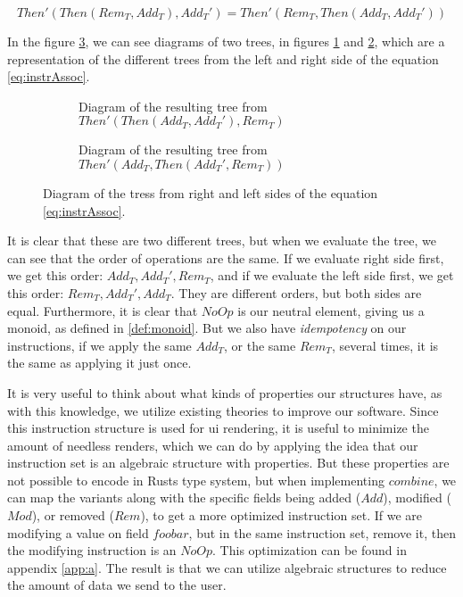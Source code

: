 \begin{equation} \label{eq:instrAssoc}
  Then'(Then(Rem_T, Add_T), Add_T') = Then'(Rem_T, Then(Add_T, Add_T'))
\end{equation}

In the figure \ref{fig:instrTree}, we can see diagrams of two trees,
in figures \ref{sfig:instrTree1} and \ref{sfig:instrTree2}, which are a
representation of the different trees from the left and right side of the
equation \ref{eq:instrAssoc}.

\begin{figure}[H]
  \begin{subfigure}[h]{0.49\linewidth}
    \centering
    
    \caption{
      Diagram of the resulting tree from $Then'(Then(Add_T, Add_T'), Rem_T)$
    }
    \label{sfig:instrTree1}
  \end{subfigure}
  \hfill
  \begin{subfigure}[h]{0.49\linewidth}
    \centering
    
    \caption{
      Diagram of the resulting tree from $Then'(Add_T, Then(Add_T', Rem_T))$
    }
    \label{sfig:instrTree2}
  \end{subfigure}
  \caption{
    Diagram of the tress from right and left sides of the equation
    \ref{eq:instrAssoc}.
  }
  \label{fig:instrTree}
\end{figure}

It is clear that these are two different trees, but when we evaluate the tree,
we can see that the order of operations are the same. If we evaluate right side
first, we get this order: $Add_T, Add_T', Rem_T$, and if we evaluate the left
side first, we get this order: $Rem_T, Add_T', Add_T$. They are different
orders, but both sides are equal. Furthermore, it is clear that $NoOp$ is our
neutral element, giving us a monoid, as defined in \ref{def:monoid}. But we
also have \textit{idempotency} on our instructions, if we apply the same
$Add_T$, or the same $Rem_T$, several times, it is the same as applying it just
once.

It is very useful to think about what kinds of properties our structures have,
as with this knowledge, we utilize existing theories to improve our software.
Since this instruction structure is used for \gls*{ui} rendering, it is useful
to minimize the amount of needless renders, which we can do by applying the idea
that our instruction set is an algebraic structure with properties. But these
properties are not possible to encode in Rusts type system, but when
implementing $combine$, we can map the variants along with the specific fields
being added ($Add$), modified ($Mod$), or removed ($Rem$), to get a more
optimized instruction set. If we are modifying a value on field $foobar$, but in
the same instruction set, remove it, then the modifying instruction is an
$NoOp$. This optimization can be found in appendix \ref{app:a}. The result is
that we can utilize algebraic structures to reduce the amount of data we send
to the user.


